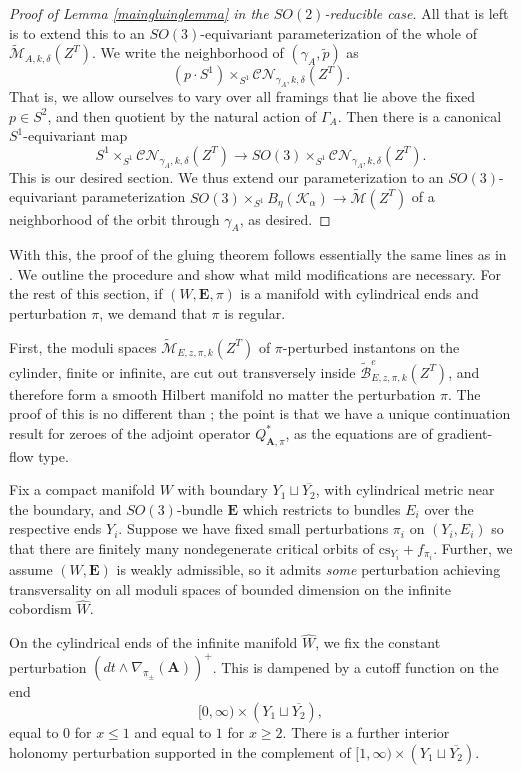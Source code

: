 \documentclass[10pt,a4paper]{amsart}
\theoremstyle{definition}
\theoremstyle{remark}
\numberwithin{figure}{qchap}
\begin{document}
\begin{proof}[Proof of Lemma \ref{maingluinglemma} in the $SO(2)$-reducible case]
All that is left is to extend this to an $SO(3)$-equivariant parameterization of the whole of $\widetilde{\mathcal M}_{A,k,\delta}(Z^T)$. We write the neighborhood of $(\gamma_A, \tilde p)$ as 
$$(p \cdot S^1) \times_{S^1} \mathcal{CN}_{\gamma_A, k, \delta}(Z^T).$$
That is, we allow ourselves to vary over all framings that lie above the fixed $p \in S^2$, and then quotient by the natural action of $\Gamma_A$. Then there is a canonical $S^1$-equivariant map 
$$S^1 \times_{S^1} \mathcal{CN}_{\gamma_A, k, \delta}(Z^T) \to SO(3) \times_{S^1} \mathcal{CN}_{\gamma_A, k, \delta}(Z^T).$$ 
This is our desired section. We thus extend our parameterization to an $SO(3)$-equivariant parameterization $SO(3) \times_{S^1} B_\eta(\mathcal K_\alpha) \to \widetilde{\mathcal M}(Z^T)$ of a neighborhood of the orbit through $\gamma_A$, as desired.
\end{proof}

With this, the proof of the gluing theorem follows essentially the same lines as in \cite[Chapters~19~and~24.7]{KMSW}. We outline the procedure and show what mild modifications are necessary. For the rest of this section, if $(W,\mathbf{E},\pi)$ is a manifold with cylindrical ends and perturbation $\pi$, we demand that $\pi$ is regular.

First, the moduli spaces $\widetilde{\mathcal M}_{E,z,\pi,k}(Z^T)$ of $\pi$-perturbed instantons on the cylinder, finite or infinite, are cut out transversely inside $\widetilde{\mathcal B}^e_{E,z,\pi,k}(Z^T)$, and therefore form a smooth Hilbert manifold no matter the perturbation $\pi$. The proof of this is no different than \cite[Theorem~17.3.1]{KMSW}; the point is that we have a unique continuation result for zeroes of the adjoint operator $Q^*_{\mathbf{A}, \pi}$, as the equations are of gradient-flow type.

Fix a compact manifold $W$ with boundary $Y_1 \sqcup \overline{Y_2}$, with cylindrical metric near the boundary, and $SO(3)$-bundle $\mathbf{E}$ which restricts to bundles $E_i$ over the respective ends $Y_i$. Suppose we have fixed small perturbations $\pi_i$ on $(Y_i, E_i)$ so that there are finitely many nondegenerate critical orbits of $\text{cs}_{Y_i}+f_{\pi_i}$. Further, we assume $(W,\mathbf{E})$ is weakly admissible, so it admits \emph{some} perturbation achieving transversality on all moduli spaces of bounded dimension on the infinite cobordism $\hat W$.

On the cylindrical ends of the infinite manifold $\hat W$, we fix the constant perturbation $(dt \wedge \nabla_{\pi_\pm}(\mathbf{A}))^+$. This is dampened by a cutoff function on the end 
$$[0, \infty) \times (Y_1 \sqcup \overline{Y_2}),$$ equal to $0$ for $x \leq 1$ and equal to $1$ for $x \geq 2$. There is a further interior holonomy perturbation supported in the complement of $[1, \infty) \times (Y_1 \sqcup \overline{Y_2})$. 
\end{document}
